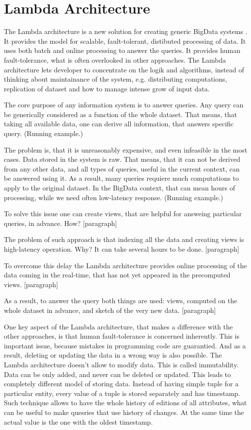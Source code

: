 \chapter{Lambda Architecture}
\label{chap:lambda_architecture}

The Lambda architecture is a new solution for creating generic BigData systems \cite{MarzWarren201401}.
It provides the model for scalable, fault-tolerant, distibuted processing of data.
It uses both batch and online processing to answer the queries.
It provides human fault-tolerance, what is often overlooked in other approaches.
The Lambda architecture lets developer to concentrate on the logik and
algorithms, instead of thinking about maintainance of the system, e.g.
distributing computations, replication of dataset and how to manage intense grow of input data.

The core purpose of any information system is to answer queries.
Any query can be generically considered as a function of the whole dataset.
That means, that taking all available data, one can derive all information, that
answers specific query.
(Running example.)

The problem is, that it is unreasonably expensive, and even infeasible in the
most cases. Data stored in the system is raw.
That means, that it can not be derived from any other data, and all types of
queries, useful in the current context, can be answered using it.
As a result, many queries requiere much computations to apply to the original
dataset.
In the BigData context, that can mean hours of processing, while we need often
low-latency response.
(Running example.)

To solve this issue one can create views, that are helpful for answeing particular queries, in advance.
How?
[paragraph]

The problem of such approach is that indexing all the data and creating
views is high-latency operation.
Why?
It can take several hours to be done.
[paragraph]

To overcome this delay the Lambda architecture provides online processing of the
data coming in the real-time, that has not yet appeared in the precomputed views.
[paragraph]

As a result, to answer the query both things are used: views, computed on the
whole dataset in advance, and sketch of the very new data.
[paragraph]

One key aspect of the Lambda architecture, that makes a difference with the
other approaches, is that human fault-tolerance is concerned inherently.
This is important issue, because mistakes in programming code are guarantied.
And as a result, deleting or updating the data in a wrong way is also possible.
The Lambda architecture doesn't allow to modify data. This is called
 immutability.
Data can be only added, and never can be deleted or updated.
This leads to completely different model of storing data.
Instead of having simple tuple for a particular entity, every value of a tuple
is stored separately and has timestamp.
Such technique allows to have the whole history of editions of all attributes, what can be useful to make quesries that use history of changes.
At the same time the actual value is the one with the oldest timestamp.

